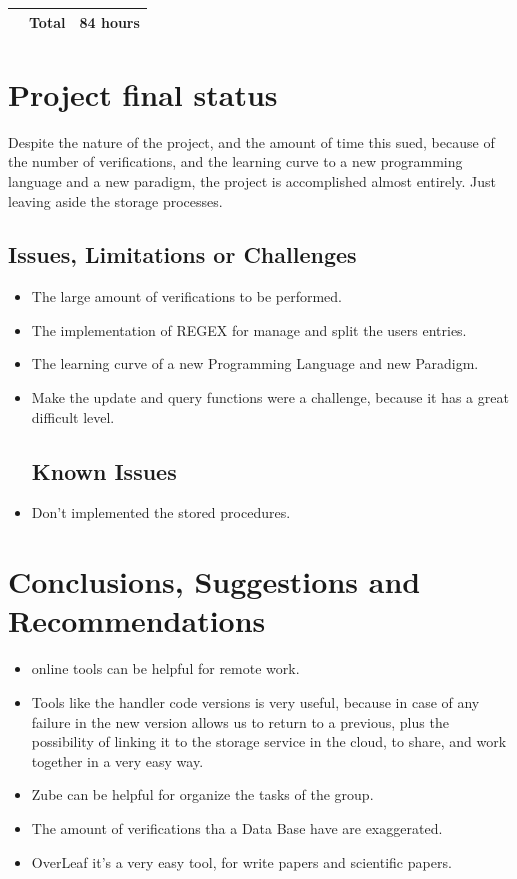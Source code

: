 \documentclass[12pt]{article}
\begin{document}
\begin{itemize}
\begin{center}
\begin{tabular}{ |c|c|c|}
  \hline
 & Total & 84 hours\\ 
 \hline
\end{tabular}
\end{center}
\section{Project final status}
Despite the nature of the project, and the amount of time this sued, because of the number of verifications, and the learning curve to a new programming language and a new paradigm, the project is accomplished almost entirely. Just leaving aside the storage processes.\newline\subsection{Issues, Limitations or Challenges}
\begin{itemize}
\item The large amount of verifications to be performed.
\item The implementation of REGEX for manage and split the users entries.
\item The learning curve of a new Programming Language and new Paradigm.
\item Make the update and query functions were a challenge, because it has a great difficult level.

\subsection{Known Issues}

\item Don't implemented the stored procedures.
\end{itemize}

\section{Conclusions, Suggestions and Recommendations}
\begin{itemize}
\item online tools can be helpful for remote work.
\item Tools like the handler code versions is very useful, because in case of any failure in the new version allows us to return to a previous, plus the possibility of linking it to the storage service in the cloud, to share, and work together in a very easy way.
\item Zube can be helpful for organize the tasks of the group.
\item The amount of verifications tha a Data Base have are exaggerated.
\item OverLeaf it's a very easy tool, for write papers and scientific papers.
\end{itemize}




\end{itemize}
\end{document}
